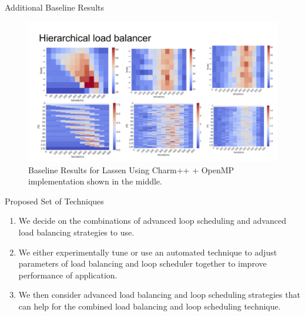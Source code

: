 \begin{frame}{Additional Baseline Results}
\begin{figure}
 \label{fig:addbr}
    \centering
  \includegraphics[scale=0.3]{plots/additionalBaselineResults.png}
  \caption{\label{fig:addbr}Baseline Results for Lassen Using Charm++ + OpenMP implementation shown in the middle.} 
\end{figure}
\end{frame}

\begin{frame}{Proposed Set of Techniques}
  \begin{enumerate}
  \item We decide on the combinations of advanced loop scheduling and advanced load balancing strategies to use. 
  \item We either experimentally tune or use an automated technique to adjust parameters of load balancing and loop scheduler together to improve performance of application. 
  \item We then consider advanced load balancing and loop scheduling strategies that can help for the combined load balancing and loop scheduling technique.
  \end{enumerate} 
\end{frame}

